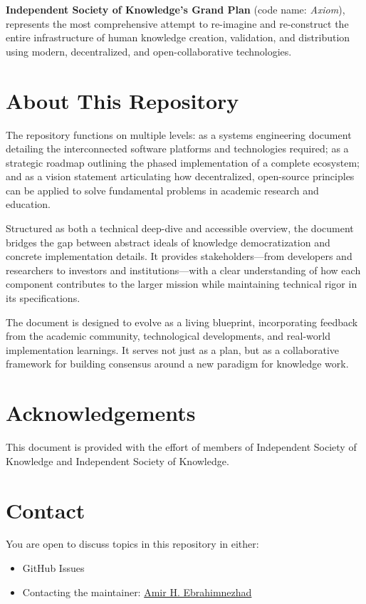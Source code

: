 \textbf{Independent Society of Knowledge's Grand Plan} (code name: \textit{Axiom}), represents the most comprehensive attempt to re-imagine and re-construct the entire infrastructure of human knowledge creation, validation, and distribution using modern, decentralized, and open-collaborative technologies.

\section*{About This Repository}

The repository functions on multiple levels: as a systems engineering document detailing the interconnected software platforms and technologies required; as a strategic roadmap outlining the phased implementation of a complete ecosystem; and as a vision statement articulating how decentralized, open-source principles can be applied to solve fundamental problems in academic research and education.

Structured as both a technical deep-dive and accessible overview, the document bridges the gap between abstract ideals of knowledge democratization and concrete implementation details.
It provides stakeholders—from developers and researchers to investors and institutions—with a clear understanding of how each component contributes to the larger mission while maintaining technical rigor in its specifications.

The document is designed to evolve as a living blueprint, incorporating feedback from the academic community, technological developments, and real-world implementation learnings.
It serves not just as a plan, but as a collaborative framework for building consensus around a new paradigm for knowledge work.

\section*{Acknowledgements}

This document is provided with the effort of members of Independent Society of Knowledge and Independent Society of Knowledge.

\section*{Contact}

You are open to discuss topics in this repository in either:
\begin{itemize}
    \item GitHub Issues
    \item Contacting the maintainer: \href{mailto:thisismeamir@outlook.com}{Amir H. Ebrahimnezhad}
\end{itemize}
